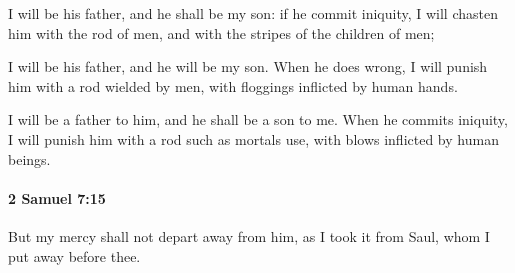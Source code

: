 			\begin{versebox}
					\item[BHS] 
					\item[ASV] I will be his father, and he shall be my son: if he commit iniquity, I will chasten him with the rod of men, and with the stripes of the children of men;
					\item[NIV] I will be his father, and he will be my son. When he does wrong, I will punish him with a rod wielded by men, with floggings inflicted by human hands.
					\item[NRSV] I will be a father to him, and he shall be a son to me. When he commits iniquity, I will punish him with a rod such as mortals use, with blows inflicted by human beings.
			\end{versebox}

		\paragraph{2 Samuel 7:15} %
			\label{2SAMUEL-7-15}

			But my mercy shall not depart away from him, as I took it from Saul, whom I put away before thee.

